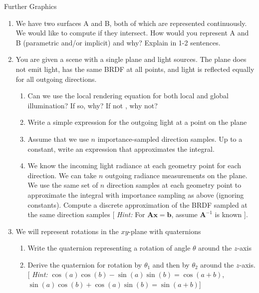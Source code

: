 \documentclass{tripos}  %
\begin{document}
\begin{question}[MockIB,year=2024,paper=2,question=4,author=rrw]{Further Graphics}


  \begin{enumerate}
    \item We have two surfaces A and B, both of which are represented continuously. We
      would like to compute if they intersect. How would you represent A and B
      (parametric and/or implicit) and why? Explain in 1-2 sentences. 
    \item You are given a scene with a single plane and light sources. The plane does not emit light, has the same BRDF at all points, and light is reflected equally for all outgoing directions.
      \begin{enumerate}
      \item Can we use the local rendering equation for both local and global illumination? If so, why? If not , why not? 
      \item Write a simple expression for the outgoing light at a point on the plane 
      \item Assume that we use $n$ importance-sampled direction samples. Up to a constant, write an expression that approximates the integral.
        \item We know the incoming light radiance at each geometry point for each direction. We can take $n$ outgoing radiance measurements on the plane.
          We use the same set of $n$ direction samples at each geometry point to approximate the integral with importance sampling as above (ignoring
          constants). Compute a discrete approximation of the BRDF sampled at the same direction samples [ {\em Hint:} For $\mathbf{A}\mathbf{x} = \mathbf{b}$, assume $\mathbf{A}^{-1}$ is known ].
      \end{enumerate}
    \item We will represent rotations in the $xy$-plane with quaternions
      \begin{enumerate}
      \item Write the quaternion representing a rotation of angle $\theta{}$ around the $z$-axis 
      \item Derive the quaternion for rotation by $\theta{}_1$ and then by $\theta{}_2$ around the $z$-axis. [ {\em Hint:}
        $\cos(a)\cos(b)-\sin(a)\sin(b) = \cos(a+b)$, $\sin(a)\cos(b)+\cos(a)\sin(b) = \sin(a+b)$] 

\end{enumerate}
\end{enumerate}
\end{question}
\end{document}
